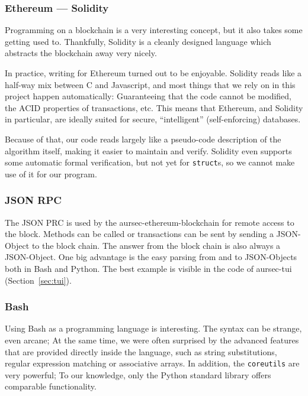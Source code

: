 
\subsubsection*{Ethereum --- Solidity}
Programming on a blockchain is a very interesting concept, but it also takes some getting used to. Thankfully, Solidity is a cleanly designed language which abstracts the blockchain away very nicely.

In practice, writing for Ethereum turned out to be enjoyable. Solidity reads like a half-way mix between C and Javascript, and most things that we rely on in this project happen automatically: Guaranteeing that the code cannot be modified, the ACID properties of transactions, etc.
This means that Ethereum, and Solidity in particular, are ideally suited for secure, \enquote{intelligent} (self-enforcing) databases.

Because of that, our code reads largely like a pseudo-code description of the algorithm itself, making it easier to maintain and verify.
Solidity even supports some automatic formal verification, but not yet for \texttt{struct}s, so we cannot make use of it for our program.

\subsubsection*{JSON RPC} %
The JSON PRC is used by the aursec-ethereum-blockchain for remote access to the block. Methods can be called or transactions can be sent by sending a JSON-Object to the block chain. The answer from the block chain is also always a JSON-Object. One big advantage is the easy parsing from and to JSON-Objects both in Bash and Python. The best example is visible in the code of aursec-tui (Section~\ref{sec:tui}).

\subsubsection*{Bash}
Using Bash as a programming language is interesting. The syntax can be strange, even arcane; At the same time, we were often surprised by the advanced features that are provided directly inside the language, such as string substitutions, regular expression matching or associative arrays.
In addition, the \texttt{coreutils} are very powerful; To our knowledge, only the Python standard library offers comparable functionality.


